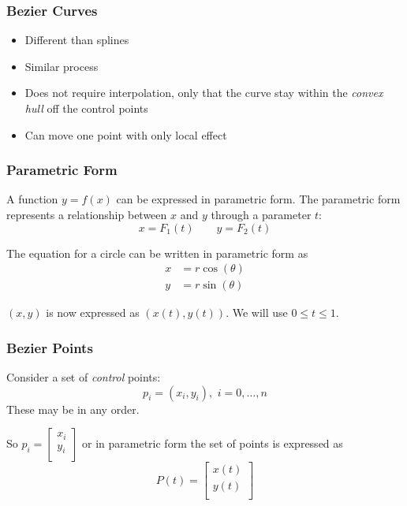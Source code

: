\documentclass[10pt]{beamer}
\begin{document}
\begin{frame}
\frametitle{Bezier Curves}
  \begin{itemize}
  \item Different than splines
  \item Similar process
  \item Does not require interpolation, only that the curve stay within
the \emph{convex hull} off the control points
  \item Can move one point with only local effect
\end{itemize}
\begin{center}
\end{center}
\end{frame}
\begin{frame}
\frametitle{Parametric Form}
  A function $y=f(x)$ can be expressed in parametric form.  The
parametric form represents a relationship between $x$ and $y$ through a
parameter $t$:
\begin{equation*}
  x=F_1(t) \qquad y=F_2(t)
\end{equation*}
\begin{example}
  The equation for a circle can be written in parametric form as
\begin{align*}
  x&=r\cos(\theta)\\
  y&=r\sin(\theta)
\end{align*}
\end{example}
$(x,y)$ is now expressed as $(x(t),y(t))$.  We will use $0\leq t \leq
1$.
\end{frame}
\begin{frame}
\frametitle{Bezier Points}
Consider a set of \emph{control} points:
\begin{equation*} 
p_i = (x_i,y_i),\,\,i=0,\dots,n
\end{equation*}
These may be in any order.
\bigskip

So $p_i = \begin{bmatrix}x_i\\y_i\\\end{bmatrix}$ or in parametric form
the set of points is expressed as
\begin{equation*}
  P(t) = \begin{bmatrix}x(t)\\y(t)\\ \end{bmatrix}
\end{equation*}
\end{frame}
\end{document}
